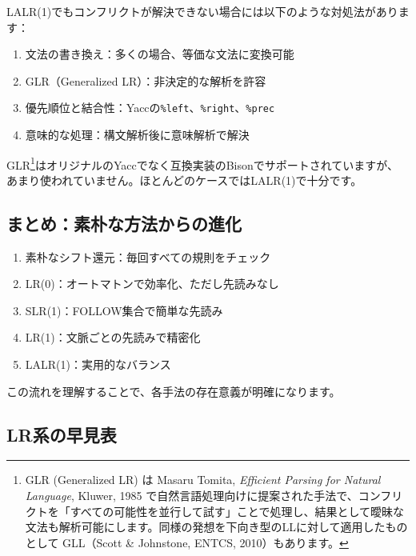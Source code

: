 LALR(1)でもコンフリクトが解決できない場合には以下のような対処法があります：

\begin{enumerate}
\def\labelenumi{\arabic{enumi}.}
\tightlist
\item
  文法の書き換え：多くの場合、等価な文法に変換可能
\item
  GLR（Generalized LR）：非決定的な解析を許容
\item
  優先順位と結合性：Yaccの\texttt{\%left}、\texttt{\%right}、\texttt{\%prec}
\item
  意味的な処理：構文解析後に意味解析で解決
\end{enumerate}

GLR\footnote{GLR (Generalized LR) は Masaru Tomita, \emph{Efficient
  Parsing for Natural Language}, Kluwer, 1985
  で自然言語処理向けに提案された手法で、コンフリクトを「すべての可能性を並行して試す」ことで処理し、結果として曖昧な文法も解析可能にします。同様の発想を下向き型のLLに対して適用したものとして
  GLL（Scott \& Johnstone, ENTCS, 2010）もあります。}はオリジナルのYaccでなく互換実装のBisonでサポートされていますが、あまり使われていません。ほとんどのケースではLALR(1)で十分です。

\hypertarget{chapter5-ux307eux3068ux3081ux7d20ux6734ux306aux65b9ux6cd5ux304bux3089ux306eux9032ux5316}{%
\subsection{まとめ：素朴な方法からの進化}\label{chapter5-ux307eux3068ux3081ux7d20ux6734ux306aux65b9ux6cd5ux304bux3089ux306eux9032ux5316}}

\begin{enumerate}
\def\labelenumi{\arabic{enumi}.}
\tightlist
\item
  素朴なシフト還元：毎回すべての規則をチェック
\item
  LR(0)：オートマトンで効率化、ただし先読みなし
\item
  SLR(1)：FOLLOW集合で簡単な先読み
\item
  LR(1)：文脈ごとの先読みで精密化
\item
  LALR(1)：実用的なバランス
\end{enumerate}

この流れを理解することで、各手法の存在意義が明確になります。

\hypertarget{chapter5-lrux7cfbux306eux65e9ux898bux8868}{%
\subsection{LR系の早見表}\label{chapter5-lrux7cfbux306eux65e9ux898bux8868}}

